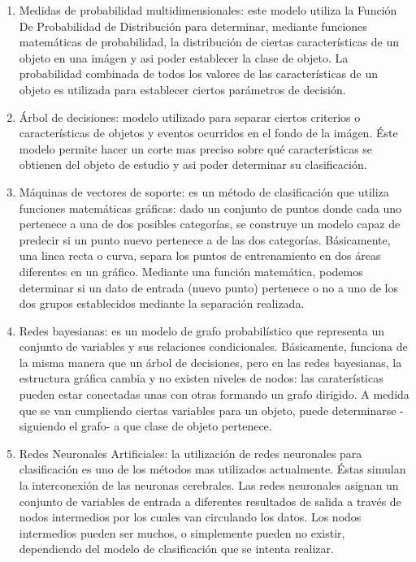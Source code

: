 \documentclass[a4paper,12pt,twoside]{article}
\begin{document}
\begin{enumerate}
	\baselineskip 0pt
	\item Medidas de probabilidad multidimensionales: este modelo utiliza la Función De Probabilidad de Distribución para determinar, mediante funciones matemáticas de probabilidad, la distribución de ciertas características de un objeto en una imágen y asi poder establecer la clase de objeto. La probabilidad combinada de todos los valores de las características de un objeto es utilizada para establecer ciertos parámetros de decisión.\\
	\item Árbol de decisiones: modelo utilizado para separar ciertos criterios o características de objetos y eventos ocurridos en el fondo de la imágen. Éste modelo permite hacer un corte mas preciso sobre qué características se obtienen del objeto de estudio y asi poder determinar su clasificación.\\
	\item Máquinas de vectores de soporte: es un método de clasificación que utiliza funciones matemáticas gráficas: dado un conjunto de puntos donde cada uno pertenece a una de dos posibles categorías, se construye un modelo capaz de predecir si un punto nuevo pertenece a de las dos categorías. Básicamente, una linea recta o curva, separa los puntos de entrenamiento en dos áreas diferentes en un gráfico. Mediante una función matemática, podemos determinar si un dato de entrada (nuevo punto) pertenece o no a uno de los dos grupos establecidos mediante la separación realizada.\\
	\item Redes bayesianas: es un modelo de grafo probabilístico que representa un conjunto de variables y sus relaciones condicionales. Básicamente, funciona de la misma manera que un árbol de decisiones, pero en las redes bayesianas, la estructura gráfica cambia y no existen niveles de nodos: las caraterísticas pueden estar conectadas unas con otras formando un grafo dirigido. A medida que se van cumpliendo ciertas variables para un objeto, puede determinarse -siguiendo el grafo- a que clase de objeto pertenece.\\
	\item Redes Neuronales Artificiales: la utilización de redes neuronales para clasificación es uno de los métodos mas utilizados actualmente. Éstas simulan la interconexión de las neuronas cerebrales. Las redes neuronales asignan un conjunto de variables de entrada a diferentes resultados de salida a través de nodos intermedios por los cuales van circulando los datos. Los nodos intermedios pueden ser muchos, o simplemente pueden no existir, dependiendo del modelo de clasificación que se intenta realizar.\\
\end{enumerate}	\baselineskip 14pt	
	
\end{document}
